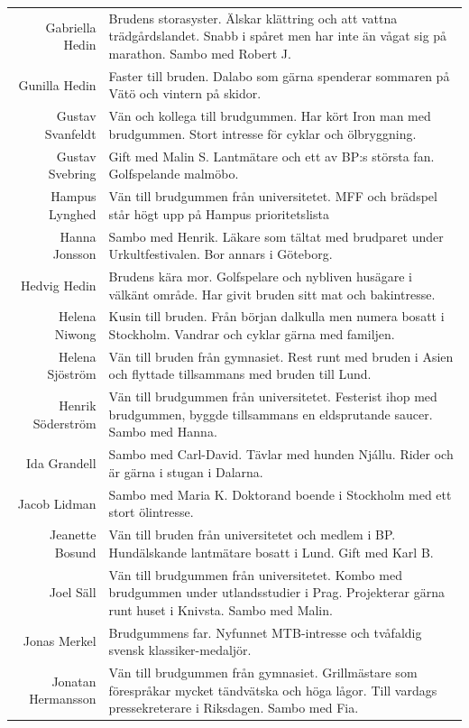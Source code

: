 \documentclass[a5paper]{article}
\begin{document}
\begin{longtable}[l]{N|L}
				Gabriella Hedin	&	Brudens storasyster. Älskar klättring och att vattna trädgårdslandet. Snabb i spåret men har inte än vågat sig på marathon. Sambo med Robert J.	\\
				Gunilla Hedin	    & Faster till bruden. Dalabo som gärna spenderar sommaren på Vätö och vintern på skidor.	\\
				Gustav Svanfeldt	& Vän och kollega till brudgummen. Har kört Iron man med brudgummen. Stort intresse för cyklar och ölbryggning.	\\
				Gustav Svebring	&	Gift med Malin S. Lantmätare och ett av BP:s största fan. Golfspelande malmöbo.	\\
				Hampus Lynghed	&	Vän till brudgummen från universitetet. MFF och brädspel står högt upp på Hampus prioritetslista 	\\
				Hanna Jonsson	&	Sambo med Henrik. Läkare som tältat med brudparet under Urkultfestivalen. Bor annars i Göteborg. 	\\
				Hedvig Hedin	&	Brudens kära mor. Golfspelare och nybliven husägare i välkänt område. Har givit bruden sitt mat och bakintresse.	\\
				Helena Niwong	&	Kusin till bruden. Från början dalkulla men numera bosatt i Stockholm. Vandrar och cyklar gärna med familjen.	\\
				Helena Sjöström	&	Vän till bruden från gymnasiet. Rest runt med bruden i Asien och flyttade tillsammans med  bruden till Lund.	\\
				Henrik Söderström	&	Vän till brudgummen från universitetet. Festerist ihop med brudgummen, byggde tillsammans en eldsprutande saucer. Sambo med Hanna.	\\
				Ida Grandell	&	Sambo med Carl-David. Tävlar med hunden Njállu. Rider och är gärna i stugan i Dalarna.	\\
				Jacob Lidman	&	Sambo med Maria K. Doktorand boende i Stockholm med ett stort ölintresse. 	\\
				Jeanette Bosund	&	Vän till bruden från universitetet och medlem i BP.  Hundälskande lantmätare bosatt i Lund. Gift med Karl B.	\\
				Joel Säll	&	Vän till brudgummen från universitetet. Kombo med brudgummen under utlandsstudier i Prag. Projekterar gärna runt huset i Knivsta. Sambo med Malin.	\\
				Jonas Merkel	&	Brudgummens far. Nyfunnet MTB-intresse och tvåfaldig svensk klassiker-medaljör.	\\
				Jonatan Hermansson	&	Vän till brudgummen från gymnasiet. Grillmästare som förespråkar mycket tändvätska och höga lågor. Till vardags pressekreterare i Riksdagen. Sambo med Fia.	\\

\end{longtable}
\end{document}
